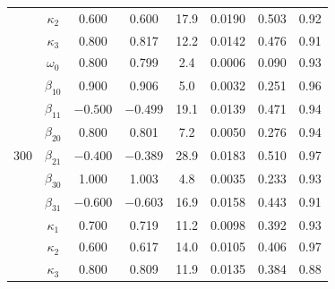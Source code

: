 \begin{table}[pos=htbp]
\begin{tabular}{@{}cccccccc@{}}
		 & $\kappa_2$ & 0.600 & 0.600 & 17.9 & 0.0190 & 0.503 & 0.92 \\
		 & $\kappa_3$ & 0.800 & 0.817 & 12.2 & 0.0142 & 0.476 & 0.91 \\
		\midrule
		 & $\omega_0$ & 0.800 & 0.799 & 2.4 & 0.0006 & 0.090 & 0.93 \\
		 & $\beta_{10}$ & 0.900 & 0.906 & 5.0 & 0.0032 & 0.251 & 0.96 \\
		 & $\beta_{11}$ & $-0.500$ & $-0.499$ & 19.1 & 0.0139 & 0.471 & 0.94 \\
		 & $\beta_{20}$ & 0.800 & 0.801 & 7.2 & 0.0050 & 0.276 & 0.94 \\
		300 & $\beta_{21}$ & $-0.400$ & $-0.389$ & 28.9 & 0.0183 & 0.510 & 0.97 \\
		 & $\beta_{30}$ & 1.000 & 1.003 & 4.8 & 0.0035 & 0.233 & 0.93 \\
		 & $\beta_{31}$ & $-0.600$ & $-0.603$ & 16.9 & 0.0158 & 0.443 & 0.91 \\
		 & $\kappa_1$ & 0.700 & 0.719 & 11.2 & 0.0098 & 0.392 & 0.93 \\
		 & $\kappa_2$ & 0.600 & 0.617 & 14.0 & 0.0105 & 0.406 & 0.97 \\
		 & $\kappa_3$ & 0.800 & 0.809 & 11.9 & 0.0135 & 0.384 & 0.88 \\
		\bottomrule
	\end{tabular}
\end{table}
